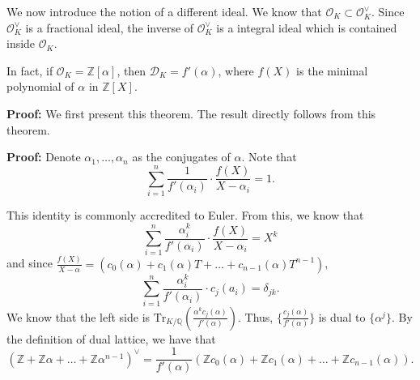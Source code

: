 \documentclass[a4paper, 12pt,oneside,openany]{book}
\begin{document}
We now introduce the notion of a different ideal. We know that $\mathcal{O}_K \subset \mathcal{O}_K^{\vee}.$ Since $\mathcal{O}_K^{\vee}$ is a fractional ideal, the inverse of $\mathcal{O}_K^{\vee}$ is a integral ideal which is contained inside $\mathcal{O}_K$.



In fact, if $\mathcal{O}_K = \mathbb{Z}[\alpha]$, then $\mathcal{D}_K = f'(\alpha)$, where $f(X)$ is the minimal polynomial of $\alpha$ in $\mathbb{Z}[X].$

\textbf{Proof:} We first present this theorem. The result directly follows from this theorem.


\textbf{Proof:} Denote $\alpha_1, \dots, \alpha_n$ as the conjugates of $\alpha$. Note that $$\sum\limits_{i=1}^n \frac{1}{f'(\alpha_i)} \cdot \frac{f(X)}{X-\alpha_i}=1.$$ 

This identity is commonly accredited to Euler. From this, we know that $$\sum\limits_{i=1}^n \frac{\alpha_i^k}{f'(\alpha_i)} \cdot \frac{f(X)}{X-\alpha_i}=X^k$$ 
and since $\frac{f(X)}{X-\alpha}=(c_0(\alpha)+c_1(\alpha)T+\dots+c_{n-1}(\alpha)T^{n-1})$,  $$\sum\limits_{i=1}^n \frac{\alpha_i^k}{f'(\alpha_i)} \cdot c_j(a_i)=\delta_{jk}.$$ 
We know that the left side is $\text{Tr}_{K/\mathbb{Q}} (\frac{\alpha^k c_j(\alpha)}{f'(\alpha)})$. Thus, $\{\frac{c_j(\alpha)}{f'(\alpha)}\}$ is dual to $\{\alpha^j\}$. By the definition of dual lattice, we have that $$(\mathbb{Z}+\mathbb{Z}\alpha+\dots+\mathbb{Z}\alpha^{n-1})^{\vee} = \frac{1}{f'(\alpha)}(\mathbb{Z}c_0(\alpha)+\mathbb{Z}c_1(\alpha)+\dots+\mathbb{Z}c_{n-1}(\alpha)).$$
\end{document}
